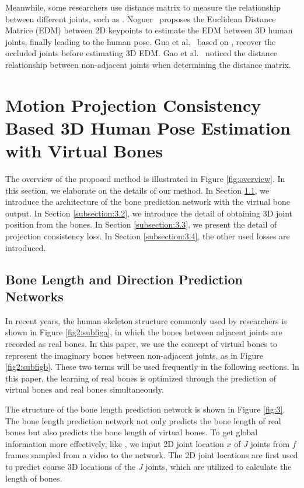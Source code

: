 \documentclass[journal]{IEEEtran}
\begin{document}
Meanwhile, some researchers use distance matrix to measure the relationship between different joints, such as \cite{moreno20173d,guo2018occluded,gao2019optimized}. Noguer~\cite{moreno20173d} proposes the Euclidean
Distance Matrice (EDM) between 2D keypoints to estimate the EDM between 3D human joints, finally leading to the human pose. Guo et al.~\cite{guo2018occluded} based on \cite{moreno20173d}, recover the occluded joints before estimating 3D EDM. Gao et al.~\cite{gao2019optimized} noticed the distance relationship between non-adjacent joints when determining the distance matrix.




\section{Motion Projection Consistency Based 3D Human Pose Estimation with Virtual Bones}

The overview of the proposed method is illustrated in Figure \ref{fig:overview}. In this section, we elaborate on the details of our method. In Section \ref{subsection:3.1}, we introduce the architecture of the bone prediction network with the virtual bone output. In Section \ref{subsection:3.2}, we introduce the detail of obtaining 3D joint position from the bones. In Section \ref{subsection:3.3}, we present the detail of projection consistency loss. In Section \ref{subsection:3.4}, the other used losses are introduced.
\subsection{Bone Length and Direction Prediction Networks}
\label{subsection:3.1}

In recent years, the human skeleton structure commonly used by researchers is shown in Figure \ref{fig2:subfiga}, in which the bones between adjacent joints are recorded as real bones. In this paper, we use the concept of virtual bones to represent the imaginary bones between non-adjacent joints, as in Figure \ref{fig2:subfigb}. These two terms will be used frequently in the following sections. In this paper, the learning of real bones is optimized through the prediction of virtual bones and real bones simultaneously.

The structure of the bone length prediction network is shown in Figure \ref{fig:3}. The bone length prediction network not only predicts the bone length of real bones but also predicts the bone length of virtual bones. To get global information more effectively, like \cite{2020Anatomy}, {we input 2D joint location $x$ of $J$ joints from $f$ frames sampled from a video to the network. The 2D joint locations are first used to predict coarse 3D locations of the $J$ joints, which are utilized to calculate the length of bones.} 
\end{document}
